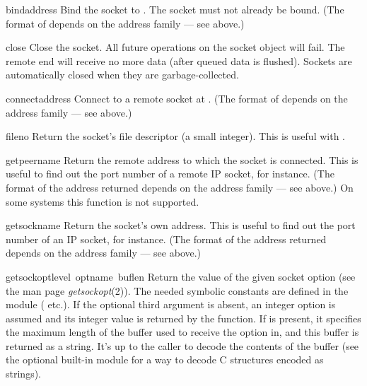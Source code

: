 \begin{funcdesc}{bind}{address}
Bind the socket to .  The socket must not already be bound.
(The format of  depends on the address family --- see above.)
\end{funcdesc}

\begin{funcdesc}{close}{}
Close the socket.  All future operations on the socket object will fail.
The remote end will receive no more data (after queued data is flushed).
Sockets are automatically closed when they are garbage-collected.
\end{funcdesc}

\begin{funcdesc}{connect}{address}
Connect to a remote socket at .
(The format of  depends on the address family --- see above.)
\end{funcdesc}

\begin{funcdesc}{fileno}{}
Return the socket's file descriptor (a small integer).  This is useful
with .
\end{funcdesc}

\begin{funcdesc}{getpeername}{}
Return the remote address to which the socket is connected.  This is
useful to find out the port number of a remote IP socket, for instance.
(The format of the address returned depends on the address family ---
see above.)  On some systems this function is not supported.
\end{funcdesc}

\begin{funcdesc}{getsockname}{}
Return the socket's own address.  This is useful to find out the port
number of an IP socket, for instance.
(The format of the address returned depends on the address family ---
see above.)
\end{funcdesc}

\begin{funcdesc}{getsockopt}{level\, optname\, buflen}
Return the value of the given socket option (see the \UNIX{} man page
{\it getsockopt}(2)).  The needed symbolic constants are defined in
the  module ( etc.).  If the optional third
argument is absent, an integer option is assumed and its integer value
is returned by the function.  If  is present, it specifies
the maximum length of the buffer used to receive the option in, and
this buffer is returned as a string.  It's up to the caller to decode
the contents of the buffer (see the optional built-in module
 for a way to decode C structures encoded as strings).
\end{funcdesc}

